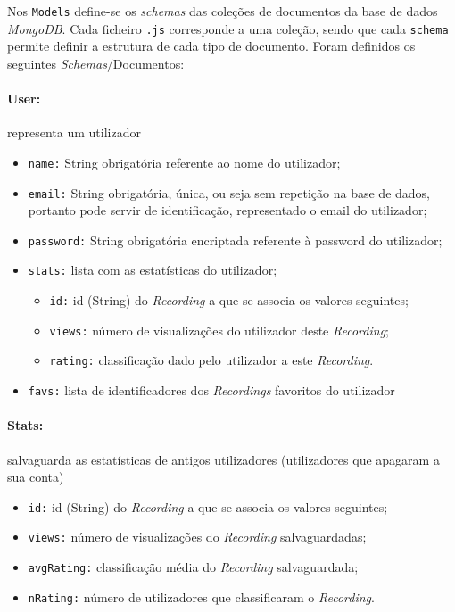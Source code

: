 \documentclass{article}
\begin{document}
Nos \texttt{Models} define-se os \textit{schemas} das coleções de documentos da base de dados \textit{MongoDB}. Cada ficheiro \texttt{.js} corresponde a uma coleção, sendo que cada \texttt{schema} permite definir a estrutura de cada tipo de documento. Foram definidos os seguintes \textit{Schemas}/Documentos:

\paragraph{\textbf{User:}} representa um utilizador
    \begin{itemize}
        \item \texttt{name:} String obrigatória referente ao nome do utilizador;
        \item \texttt{email:} String obrigatória, única, ou seja sem repetição na base de dados, portanto pode servir de identificação, representado o email do utilizador;
        \item \texttt{password:} String obrigatória encriptada referente à password do utilizador;
        \item \texttt{stats:} lista com as estatísticas do utilizador;
            \begin{itemize}
                \item \texttt{id:} id (String) do \textit{Recording} a que se associa os valores seguintes;
                \item \texttt{views:} número de visualizações do utilizador deste \textit{Recording};
                \item \texttt{rating:} classificação dado pelo utilizador a este \textit{Recording}.
            \end{itemize}
        \item \texttt{favs:} lista de identificadores dos \textit{Recordings} favoritos do utilizador
    \end{itemize}

\paragraph{\textbf{Stats:}} salvaguarda as estatísticas de antigos utilizadores (utilizadores que apagaram a sua conta)
    \begin{itemize}
        \item \texttt{id:} id (String) do \textit{Recording} a que se associa os valores seguintes;
        \item \texttt{views:} número de visualizações do \textit{Recording} salvaguardadas;
        \item \texttt{avgRating:} classificação média do \textit{Recording} salvaguardada;
        \item \texttt{nRating:} número de utilizadores que classificaram o \textit{Recording}.
    \end{itemize}
\end{document}
